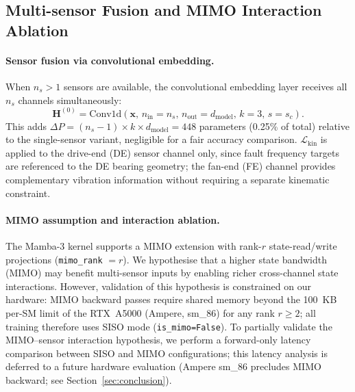 \subsection{Multi-sensor Fusion and MIMO Interaction Ablation}
\label{subsec:multisensor}

\paragraph{Sensor fusion via convolutional embedding.}
When $n_s > 1$ sensors are available, the convolutional embedding layer
receives all $n_s$ channels simultaneously:
\begin{equation}
  \mathbf{H}^{(0)} = \text{Conv1d}(\mathbf{x},\, n_{\text{in}}=n_s,\,
    n_{\text{out}}=d_{\text{model}},\, k=3,\, s=s_c).
  \label{eq:conv_embed}
\end{equation}
This adds $\Delta P = (n_s - 1) \times k \times d_{\text{model}} = 448$
parameters (0.25\% of total) relative to the single-sensor variant,
negligible for a fair accuracy comparison.
$\mathcal{L}_{\text{kin}}$ is applied to the drive-end (DE) sensor channel
only, since fault frequency targets are referenced to the DE bearing geometry;
the fan-end (FE) channel provides complementary vibration information without
requiring a separate kinematic constraint.

\paragraph{MIMO assumption and interaction ablation.}
The Mamba-3 kernel supports a MIMO extension with rank-$r$ state-read/write
projections (\texttt{mimo\_rank} $= r$).
We hypothesise that a higher state bandwidth (MIMO) may benefit multi-sensor
inputs by enabling richer cross-channel state interactions.
However, validation of this hypothesis is constrained on our hardware:
MIMO backward passes require shared memory beyond the 100~KB per-SM limit
of the RTX~A5000 (Ampere, sm\_86) for any rank $r \geq 2$; all training
therefore uses SISO mode (\texttt{is\_mimo=False}).
To partially validate the MIMO--sensor interaction hypothesis, we perform a
forward-only latency comparison between SISO and MIMO configurations;
this latency analysis is deferred to a future hardware evaluation
(Ampere sm\_86 precludes MIMO backward; see Section~\ref{sec:conclusion}).

